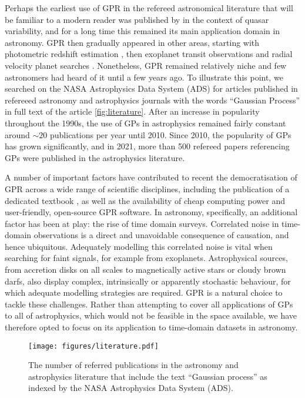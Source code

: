\documentclass[letterpaper]{ar-1col}
\begin{document}
Perhaps the earliest use of GPR in the refereed astronomical literature that will be familiar to a modern reader was published by \citet{prh92a} in the context of quasar variability, and for a long time this remained its main application domain in astronomy. GPR then gradually appeared in other areas, starting with photometric redshift estimation \citep{2006ApJ...647..102W}, then exoplanet transit observations \citep{2009ApJ...704...51C,2012MNRAS.419.2683G} and radial velocity planet searches \citep{2012MNRAS.419.3147A,2014MNRAS.443.2517H}. Nonetheless, GPR remained relatively niche and few astronomers had heard of it until a few years ago. To illustrate this point, we searched on the NASA Astrophysics Data System (ADS) for articles published in refereeed astronomy and astrophysics journals with the words ``Gaussian Process'' in full text of the article \autoref{fig:literature}.
After an increase in popularity throughout the 1990s, the use of GPs in astrophysics remained fairly constant around $\sim20$ publications per year until 2010.
Since 2010, the popularity of GPs has grown significantly, and in 2021, more than 500 refereed papers referencing GPs were published in the astrophysics literature.

A number of important factors have contributed to recent the democratisation of GPR across a wide range of scientific disciplines, including the publication of a dedicated textbook \citep{gpml}, as well as the availability of cheap computing power and user-friendly, open-source GPR software. In astronomy, specifically, an additional factor has been at play: the rise of time domain surveys. Correlated noise in time-domain observations is a direct and unavoidable consequence of causation, and hence ubiquitous. Adequately modelling this correlated noise is vital when searching for faint signals, for example from exoplanets. Astrophysical sources, from accretion disks on all scales to magnetically active stars or cloudy brown darfs, also display complex, intrinsically or apparently stochastic behaviour, for which adequate modelling strategies are required. GPR is a natural choice to tackle these challenges. Rather than attempting to cover all applications of GPs to all of astrophysics, which would not be feasible in the space available, we have therefore opted to focus on its application to time-domain datasets in astronomy.

\begin{figure}[ht]
  \centering
  \texttt{[image: figures/literature.pdf]}
  \caption{The number of referred publications in the astronomy and astrophysics literature that include the text ``Gaussian process'' as indexed by the NASA Astrophysics Data System (ADS).}
  \label{fig:literature}
\end{figure}
\end{document}
